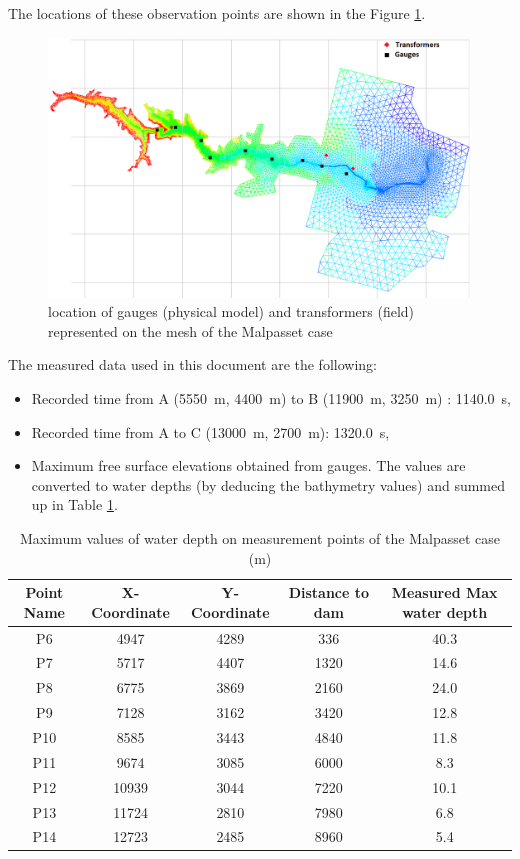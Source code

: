 The locations of these observation points are shown in the Figure \ref{fig:malpasset:MeasurePoints}.
\begin{figure}[H]
  \centering
  \includegraphics[width=1.0\textwidth]{img/MeasurePoints.png}
  \caption{location of gauges (physical model) and transformers (field) represented on the mesh of the Malpasset case}\label{fig:malpasset:MeasurePoints}
\end{figure}

The measured data used in this document are the following:
\begin{itemize}
\itemsep0em
\item Recorded time from A (5550~m, 4400~m) to B (11900~m, 3250~m) : 1140.0~s,
\item Recorded time from A to C (13000~m, 2700~m): 1320.0~s,
\item Maximum free surface elevations obtained from gauges. The values are converted to water depths (by deducing the bathymetry values) and summed up in Table \ref{tab:malpasset:MaxMeasures}.
\end{itemize}

\begin{table}[H]
  \centering
  \begin{tabular}{|c|c|c|c|c|}
    \hline Point Name & X-Coordinate & Y-Coordinate & Distance to dam & Measured Max water depth \\
    \hline P6 & 4947 & 4289 & 336 & 40.3\\
    P7 & 5717 & 4407 & 1320 & 14.6\\
    P8 & 6775 & 3869 & 2160 & 24.0\\
    P9 & 7128 & 3162 & 3420 & 12.8\\
    P10 & 8585 & 3443 & 4840 & 11.8 \\
    P11 & 9674 & 3085 & 6000 & 8.3\\
    P12 & 10939 & 3044 & 7220 & 10.1\\
    P13 & 11724 & 2810 & 7980 & 6.8 \\
    P14 & 12723 & 2485 & 8960 & 5.4\\
    \hline
  \end{tabular}
  \caption{Maximum values of water depth on measurement points of the Malpasset case (m)}
  \label{tab:malpasset:MaxMeasures}
\end{table}

